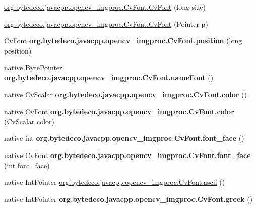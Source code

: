 \begin{DoxyCompactItemize}
\item 
\hyperlink{group__imgproc_ga975d7e1cd96341017ba94edf5d67c293}{org.\+bytedeco.\+javacpp.\+opencv\+\_\+imgproc.\+Cv\+Font.\+Cv\+Font} (long size)
\item 
\hyperlink{group__imgproc_ga88da32852b924d5138270b0fbb8e21ce}{org.\+bytedeco.\+javacpp.\+opencv\+\_\+imgproc.\+Cv\+Font.\+Cv\+Font} (Pointer p)
\item 
\mbox{\label{group__imgproc_gaf61409c9e77974c682889969bcf06fb2}} 
Cv\+Font {\bfseries org.\+bytedeco.\+javacpp.\+opencv\+\_\+imgproc.\+Cv\+Font.\+position} (long position)
\item 
\mbox{\label{group__imgproc_ga7c4c2e7ab51e67c86496662b0b0a2f98}} 
native Byte\+Pointer {\bfseries org.\+bytedeco.\+javacpp.\+opencv\+\_\+imgproc.\+Cv\+Font.\+name\+Font} ()
\item 
\mbox{\label{group__imgproc_gabe989de77a7edb13f9926655a5456d08}} 
native Cv\+Scalar {\bfseries org.\+bytedeco.\+javacpp.\+opencv\+\_\+imgproc.\+Cv\+Font.\+color} ()
\item 
\mbox{\label{group__imgproc_gab77c779ef741a907a31b860b3373b279}} 
native Cv\+Font {\bfseries org.\+bytedeco.\+javacpp.\+opencv\+\_\+imgproc.\+Cv\+Font.\+color} (Cv\+Scalar color)
\item 
\mbox{\label{group__imgproc_ga5c485323cfded3d1860513142d07cc7d}} 
native int {\bfseries org.\+bytedeco.\+javacpp.\+opencv\+\_\+imgproc.\+Cv\+Font.\+font\+\_\+face} ()
\item 
\mbox{\label{group__imgproc_ga7323aa5149ea934f9f9a14f3159164b2}} 
native Cv\+Font {\bfseries org.\+bytedeco.\+javacpp.\+opencv\+\_\+imgproc.\+Cv\+Font.\+font\+\_\+face} (int font\+\_\+face)
\item 
native Int\+Pointer \hyperlink{group__imgproc_ga172965ffbfb59bdefa408680e0b5ff62}{org.\+bytedeco.\+javacpp.\+opencv\+\_\+imgproc.\+Cv\+Font.\+ascii} ()
\item 
\mbox{\label{group__imgproc_ga6f393fc4300b59f0cf1e5865eb51e193}} 
native Int\+Pointer {\bfseries org.\+bytedeco.\+javacpp.\+opencv\+\_\+imgproc.\+Cv\+Font.\+greek} ()
\item 

\end{DoxyCompactItemize}
